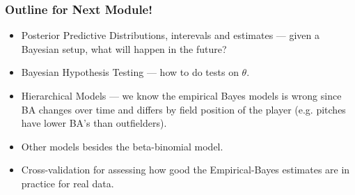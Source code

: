 \documentclass[slides]{beamer} %
\begin{document}
\begin{frame}
	\frametitle{Outline for Next Module!}
\pause 
\begin{itemize}
\item Posterior Predictive Distributions, interevals and estimates --- given a Bayesian setup, what will happen in the future? \pause 
\item Bayesian Hypothesis Testing --- how to do tests on $\theta$. \pause 
\item Hierarchical Models --- we know the empirical Bayes models is wrong since BA changes over time and differs by field position of the player (e.g. pitches have lower BA's than outfielders). \pause 
\item Other models besides the beta-binomial model. \pause 
\item Cross-validation for assessing how good the Empirical-Bayes estimates are in practice for real data.
\end{itemize}
\end{frame}
\end{document}
